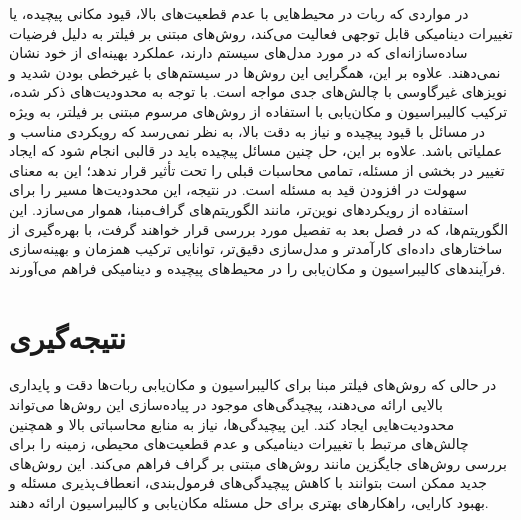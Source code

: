در مواردی که ربات در محیط‌هایی با عدم قطعیت‌های بالا، قیود مکانی پیچیده، یا تغییرات دینامیکی قابل توجهی فعالیت می‌کند، روش‌های مبتنی بر فیلتر به دلیل فرضیات ساده‌سازانه‌ای که در مورد مدل‌های سیستم دارند، عملکرد بهینه‌ای از خود نشان نمی‌دهند. علاوه بر این، همگرایی این روش‌ها در سیستم‌های با غیرخطی‌ بودن شدید و نویزهای غیرگاوسی با چالش‌های جدی مواجه است.
با توجه به محدودیت‌های ذکر شده، ترکیب کالیبراسیون و مکان‌یابی با استفاده از روش‌های مرسوم مبتنی بر فیلتر، به ویژه در مسائل با قیود پیچیده و نیاز به دقت بالا، به نظر نمی‌رسد که رویکردی مناسب و عملیاتی باشد. علاوه بر این، حل چنین مسائل پیچیده باید در قالبی انجام شود که ایجاد تغییر در بخشی از مسئله، تمامی محاسبات قبلی را تحت تأثیر قرار ندهد؛ این به معنای سهولت در افزودن قید به مسئله است. در نتیجه، این محدودیت‌ها مسیر را برای استفاده از رویکردهای نوین‌تر، مانند الگوریتم‌های گراف‌مبنا، هموار می‌سازد. این الگوریتم‌ها، که در فصل بعد به تفصیل مورد بررسی قرار خواهند گرفت، با بهره‌گیری از ساختارهای داده‌ای کارآمدتر و مدل‌سازی دقیق‌تر، توانایی ترکیب همزمان و بهینه‌سازی فرآیندهای کالیبراسیون و مکان‌یابی را در محیط‌های پیچیده و دینامیکی فراهم می‌آورند.

\section{نتیجه‌گیری}
در حالی که روش‌های فیلتر مبنا برای کالیبراسیون و مکان‌یابی ربات‌ها دقت و پایداری بالایی ارائه می‌دهند، پیچیدگی‌های موجود در پیاده‌سازی این روش‌ها می‌تواند محدودیت‌هایی ایجاد کند. این پیچیدگی‌ها، نیاز به منابع محاسباتی بالا و همچنین چالش‌های مرتبط با تغییرات دینامیکی و عدم قطعیت‌های محیطی، زمینه را برای بررسی روش‌های جایگزین مانند روش‌های مبتنی بر گراف فراهم می‌کند. این روش‌های جدید ممکن است بتوانند با کاهش پیچیدگی‌های فرمول‌بندی، انعطاف‌‌پذیری مسئله و بهبود کارایی، راهکارهای بهتری برای حل مسئله مکان‌یابی و کالیبراسیون ارائه دهند.
